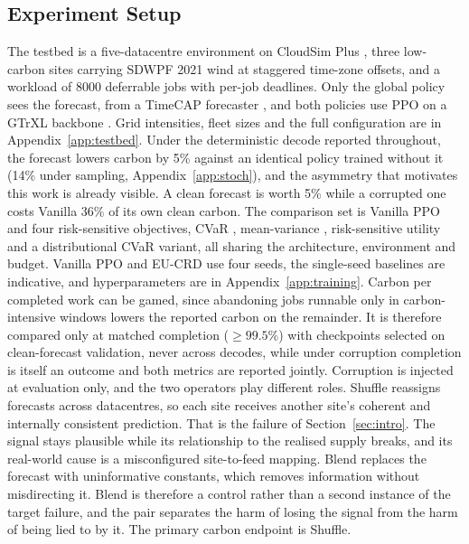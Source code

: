 \documentclass{article} %
\begin{document}
\subsection{Experiment Setup}
\label{sec:setup}
The testbed is a five-datacentre environment on CloudSim Plus \citep{silvafilhoCloudSimCloudComputing2017}, three low-carbon sites carrying SDWPF 2021 wind \citep{zhouSDWPFDatasetSpatial2024} at staggered time-zone offsets, and a workload of 8000 deferrable jobs with per-job deadlines. Only the global policy sees the forecast, from a TimeCAP forecaster \citep{ren2026timecap}, and both policies use PPO \citep{schulman2017proximal} on a GTrXL backbone \citep{parisotto2020stabilizing}. Grid intensities, fleet sizes and the full configuration are in Appendix~\ref{app:testbed}. Under the deterministic decode reported throughout, the forecast lowers carbon by 5\% against an identical policy trained without it (14\% under sampling, Appendix~\ref{app:stoch}), and the asymmetry that motivates this work is already visible. A clean forecast is worth 5\% while a corrupted one costs Vanilla 36\% of its own clean carbon. The comparison set is Vanilla PPO and four risk-sensitive objectives, CVaR \citep{2888116.2888133}, mean-variance \citep{di2012policy}, risk-sensitive utility \citep{6855488} and a distributional CVaR variant, all sharing the architecture, environment and budget. Vanilla PPO and EU-CRD use four seeds, the single-seed baselines are indicative, and hyperparameters are in Appendix~\ref{app:training}. Carbon per completed work can be gamed, since abandoning jobs runnable only in carbon-intensive windows lowers the reported carbon on the remainder. It is therefore compared only at matched completion ($\geq 99.5\%$) with checkpoints selected on clean-forecast validation, never across decodes, while under corruption completion is itself an outcome and both metrics are reported jointly. Corruption is injected at evaluation only, and the two operators play different roles. Shuffle reassigns forecasts across datacentres, so each site receives another site's coherent and internally consistent prediction. That is the failure of Section~\ref{sec:intro}. The signal stays plausible while its relationship to the realised supply breaks, and its real-world cause is a misconfigured site-to-feed mapping. Blend replaces the forecast with uninformative constants, which removes information without misdirecting it. Blend is therefore a control rather than a second instance of the target failure, and the pair separates the harm of losing the signal from the harm of being lied to by it. The primary carbon endpoint is Shuffle.
\end{document}
